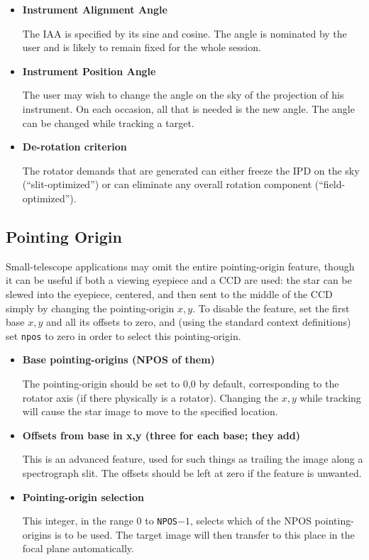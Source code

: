 \documentclass[12pt,fleqn,twoside]{article}
\renewcommand{\_}{{\tt\char'137}}     %
\begin{document}
\begin{itemize}

\item {\bf Instrument Alignment Angle}

      The IAA is specified by its sine and cosine.  The
      angle is nominated by the user and is likely to remain
      fixed for the whole session.

\item {\bf Instrument Position Angle}

      The user may wish to change the angle on the sky of
      the projection of his instrument.  On each occasion,
      all that is needed is the new angle.  The angle can
      be changed while tracking a target.

\item {\bf De-rotation criterion}

      The rotator demands that are generated can either
      freeze the IPD on the sky (``slit-optimized'')
      or can eliminate any overall
      rotation component (``field-optimized'').

\end{itemize}

\subsection{Pointing Origin}

Small-telescope applications may omit the entire
pointing-origin feature, though it can be useful if both a viewing
eyepiece and a CCD are used: the star can be slewed into
the eyepiece, centered, and then sent to the middle of the CCD
simply by changing the pointing-origin $x,y$.  To disable
the feature, set the first base $x,y$ and all
its offsets to zero, and (using the standard context
definitions) set {\tt npos} to zero in order to
select this pointing-origin.

\begin{itemize}

\item {\bf Base pointing-origins (NPOS of them)}

      The pointing-origin should be set to 0,0 by default,
      corresponding to the rotator axis (if there physically is a
      rotator).  Changing the $x,y$ while tracking will cause
      the star image to move to the specified location.

\item {\bf Offsets from base in x,y (three for each base; they add)}

      This is an advanced feature, used for such things
      as trailing the image along a spectrograph slit.
      The offsets should be left at zero if the feature
      is unwanted.

\item {\bf Pointing-origin selection}

      This integer, in the range 0 to {\tt NPOS}$-1$, selects which
      of the NPOS pointing-origins is to be used.  The target
      image will then transfer to this place in the focal
      plane automatically.

\end{itemize}
\end{document}
